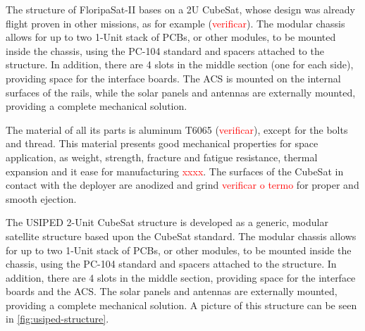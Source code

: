 The structure of FloripaSat-II bases on a 2U CubeSat, whose design was already flight proven in other missions, as for example (\textcolor{red}{verificar}). The modular chassis allows for up to two 1-Unit stack of PCBs, or other modules, to be mounted inside the chassis, using the PC-104 standard and spacers attached to the structure. In addition, there are 4 slots in the middle section (one for each side), providing space for the interface boards. The ACS is mounted on the internal surfaces of the rails, while the solar panels and antennas are externally mounted, providing a complete mechanical solution.

The material of all its parts is aluminum T6065 (\textcolor{red}{verificar}), except for the bolts and thread. This material presents good mechanical properties for space application, as weight, strength, fracture and fatigue resistance, thermal expansion and it ease for manufacturing \textcolor{red}{xxxx}. The surfaces of the CubeSat in contact with the deployer are anodized and grind \textcolor{red}{verificar o termo} for proper and smooth ejection. %



The USIPED 2-Unit CubeSat structure is developed as a generic, modular satellite structure based upon the CubeSat standard. The modular chassis allows for up to two 1-Unit stack of PCBs, or other modules, to be mounted inside the chassis, using the PC-104 standard and spacers attached to the structure. In addition, there are 4 slots in the middle section, providing space for the interface boards and the ACS. The solar panels and antennas are externally mounted, providing a complete mechanical solution. A picture of this structure can be seen in \autoref{fig:usiped-structure}.


